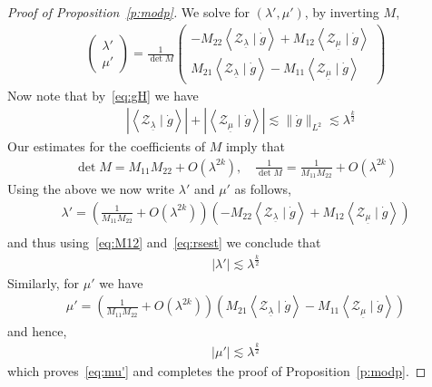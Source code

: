 \documentclass[10pt,reqno]{amsart}
\newcommand{\ZZ}{\mathcal{Z}}
\newcommand{\la}{\lambda}
\newcommand{\ka}{\kappa}
\newcommand{\La}{\Lambda}
\newcommand{\U}{\underline}
\newcommand{\ang}[1]{\left\langle{#1}\right\rangle}
\newcommand{\abs}[1]{\left\lvert{#1}\right\rvert}
\newcommand{\EQ}[1]{\begin{equation}\begin{split} #1 \end{split}\end{equation}}
\newcommand{\pmat}[1]{\begin{pmatrix} #1 \end{pmatrix}}
\numberwithin{equation}{section}
\theoremstyle{remark}
\newcommand{\mif}{{\ \ \text{if} \ \ }}
\newcommand{\dr}{\, \mathrm{d}r}
\newcommand{\ula}{\underline{\lambda}}
\newcommand{\umu}{\underline{\mu}}
\newcommand{\0}{\emptyset}
\begin{document}
\begin{proof}[Proof of Proposition~\ref{p:modp}]
    We solve for  $(\la', \mu')$, by inverting $M$, 
   \EQ{
   \pmat{  \la' \\ \mu ' } =  \frac{1}{\det M}  \pmat{ - M_{22} \ang{ \ZZ_{\ula} \mid  \dot g} + M_{12} \ang{\ZZ_{\umu} \mid  \dot g}  \\  M_{21}  \ang{\ZZ_{\ula} \mid  \dot g}- M_{11}  \ang{\ZZ_{\umu} \mid  \dot g}}
   }
   Now note that by~\eqref{eq:gH} we have 
   \EQ{ \label{eq:rsest} 
   &\abs{ \ang{\ZZ_{\ula} \mid  \dot g}} + \abs{ \ang{\ZZ_{\umu} \mid  \dot g}} \lesssim \| \dot g \|_{L^2} \lesssim \la^{\frac{k}{2}}
   }
   Our estimates for the coefficients of $M$ imply  that 
   \EQ{
   \det M =   M_{11}M_{22} + O( \la^{2k}) , \quad
   \frac{1}{\det M}  = \frac{1}{M_{11} M_{22}} + O( \la^{2k})
   }
   Using the above we now write $\la'$ and $\mu'$ as follows, 
   \EQ{
   \la' =  \left( \frac{1}{M_{11} M_{22}} + O( \la^{2k}) \right) \left( - M_{22} \ang{ \ZZ_{\ula} \mid  \dot g} + M_{12} \ang{\ZZ_{\umu} \mid  \dot g}  \right)  \\
   }
and thus using~\eqref{eq:M12} and~\eqref{eq:rsest} we conclude that 
\EQ{ \label{la'est}
\abs{\la'} \lesssim \la^{\frac{k}{2}}
}
Similarly, for $\mu'$ we have 
\EQ{
 \mu' =  \left( \frac{1}{M_{11} M_{22}} + O( \la^{2k}) \right) \left(  M_{21} \ang{ \ZZ_{\ula} \mid  \dot g} - M_{11} \ang{\ZZ_{\umu} \mid  \dot g}  \right) 
}
and hence, 
\EQ{ 
\abs{ \mu'} \lesssim \la^{\frac{k}{2}}
}
which proves~\eqref{eq:mu'} and  completes the proof of Proposition~\ref{p:modp}. 
 \end{proof} 
 
\end{document}
